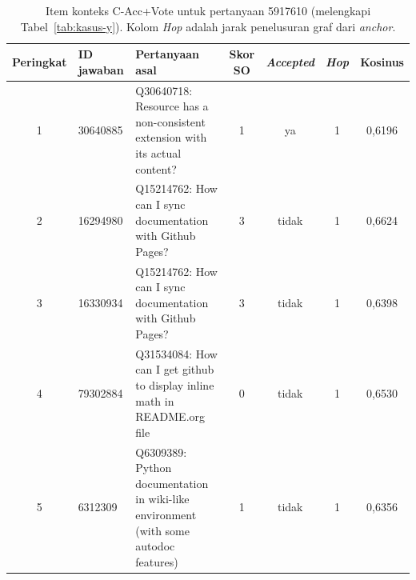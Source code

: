 \begin{table}[!htbp]
\centering
\scriptsize
\caption{Item konteks C-Acc+Vote untuk pertanyaan 5917610 (melengkapi Tabel~\ref{tab:kasus-y}). Kolom \emph{Hop} adalah jarak penelusuran graf dari \emph{anchor}.}
\label{tab:lamp-y-konteks}
\renewcommand{\arraystretch}{1.25}
\begin{tabularx}{\textwidth}{|c|l|>{\raggedright\arraybackslash}X|c|c|c|c|}
\hline
\textbf{Peringkat} & \textbf{ID jawaban} & \textbf{Pertanyaan asal} & \textbf{Skor SO} & \textbf{\emph{Accepted}} & \textbf{\emph{Hop}} & \textbf{Kosinus} \\
\hline
1 & 30640885 & Q30640718: Resource has a non-consistent extension with its actual content? & 1 & ya & 1 & 0,6196 \\
\hline
2 & 16294980 & Q15214762: How can I sync documentation with Github Pages? & 3 & tidak & 1 & 0,6624 \\
\hline
3 & 16330934 & Q15214762: How can I sync documentation with Github Pages? & 3 & tidak & 1 & 0,6398 \\
\hline
4 & 79302884 & Q31534084: How can I get github to display inline math in README.org file & 0 & tidak & 1 & 0,6530 \\
\hline
5 & 6312309 & Q6309389: Python documentation in wiki-like environment (with some autodoc features) & 1 & tidak & 1 & 0,6356 \\
\hline
\end{tabularx}
\end{table}
